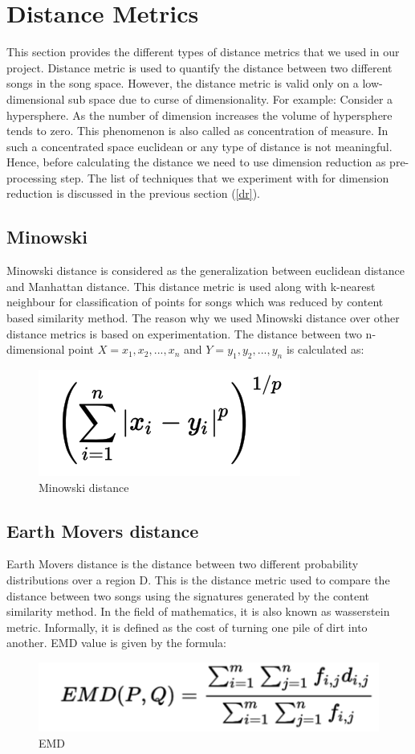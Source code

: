 \documentclass[12pt]{article}
\begin{document}
\section{Distance Metrics}\label{sec:dist}
This section provides the different types of distance metrics that we used in our project. Distance metric is used to quantify the distance between two different songs in the song space. However, the distance metric is valid only on a low-dimensional sub space due to curse of dimensionality. For example: Consider a hypersphere. As the number of dimension increases the volume of hypersphere tends to zero. This phenomenon is also called as concentration of measure. In such a concentrated space euclidean or any type of distance is not meaningful. Hence, before calculating the distance we need to use dimension reduction as pre-processing step. The list of techniques that we experiment with for dimension reduction is discussed in the previous section (\ref{dr}).


\subsection{Minowski}
Minowski distance is considered as the generalization between euclidean distance and Manhattan distance. This distance metric is used along with k-nearest neighbour for classification of points for songs which was reduced by content based similarity method. The reason why we used Minowski distance over other distance metrics is based on experimentation. The distance between two n-dimensional point $ X = {x_1,x_2,...,x_n}$ and $ Y = {y_1,y_2,...,y_n} $ is calculated as:
\begin{figure}[h]\label{minowski}
\center
\includegraphics{fig3.png}
\caption{Minowski distance}
\end{figure}
\subsection{Earth Movers distance}
Earth Movers distance is the distance between two different probability distributions over a region D. This is the distance metric used to compare the distance between two songs using the signatures generated by the content similarity method. In the field of mathematics, it is also known as wasserstein metric. Informally, it is defined as the cost of turning one pile of dirt into another. EMD value is given by the formula:
\begin{figure}[h]\label{emd}
\center
\includegraphics[scale=0.5]{emd.png}
\caption{EMD}
\end{figure}
\end{document}
